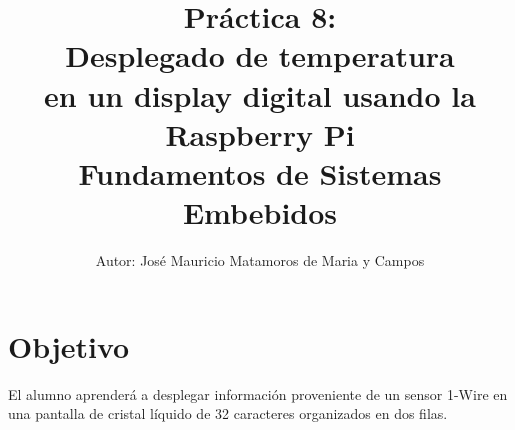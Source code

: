 \documentclass[letterpaper,10.5pt]{article}
\author{\footnotesize Autor: José Mauricio Matamoros de Maria y Campos}
\title{Práctica 8:\\Desplegado de temperatura\\en un display digital usando la Raspberry Pi\\
{\large Fundamentos de Sistemas Embebidos}}
\date{}
\begin{document}
\maketitle

\section{Objetivo}%
\label{sec:objective}
El alumno aprenderá a desplegar información proveniente de un sensor 1-Wire en una pantalla de cristal líquido de 32 caracteres organizados en dos filas.







\appendix

% 
\end{document}
